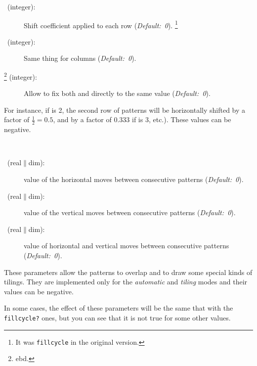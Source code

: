 \documentclass[fontsize=11pt,english,BCOR=10mm,DIV=12,bibliography=totoc,parskip=false,
   headings=small, headinclude=false,footinclude=false,oneside]{pst-doc}
\begin{document}
\begin{description}
  \item [\footnotemark\ (integer)\hfill :] Shift
  coefficient applied to each row (\emph{Default:~0}).
  \footnote{It was \texttt{fillcycle} in the original version.}
  \item [\footnotemark\ (integer)\hfill :] Same thing for
  columns (\emph{Default:~0}).
  \item [\footnote{ebd.} (integer)\hfill :] Allow to fix
  both  and  directly to the same value
  (\emph{Default:~0}).
\end{description}

  For instance, if  is 2, the second row of patterns will
be horizontally shifted by a factor of $\frac{1}{2}=0.5$, and by a factor of
0.333 if  is 3, etc.). These values can be negative.

\begin{LTXexample}[width=\linewidth]
\psboxfill{\Square}
\newcommand\TilingA[1]{\Tiling[fillcyclex=#1]{(3,3)}}
\TilingA{0} \TilingA{1} \quad
\TilingA{2} \TilingA{3}\quad
\TilingA{4} \TilingA{5}\quad
\TilingA{6} \TilingA{-3}\\[3mm]
\quad
{}\quad
{}\quad
{}
\end{LTXexample}

\begin{description}
  \item [\footnotemark\ (real$\|$dim)\hfill :] value of the
  horizontal moves between consecutive patterns (\emph{Default:~0}).
  \item [\footnotemark\ (real$\|$dim)\hfill :] value of the
  vertical moves between consecutive patterns (\emph{Default:~0}).
  \item [\footnotemark\ (real$\|$dim)\hfill :] value of
  horizontal and vertical moves between consecutive patterns
  (\emph{Default:~0}).
\end{description}

  These parameters allow the patterns to overlap and to draw some special
kinds of tilings. They are implemented only for the \emph{automatic} and
\emph{tiling} modes and their values can be negative.

  In some cases, the effect of these parameters will be the same that with the 
\texttt{fillcycle?} ones, but you can see that it is not true for some other
values.
\end{document}
